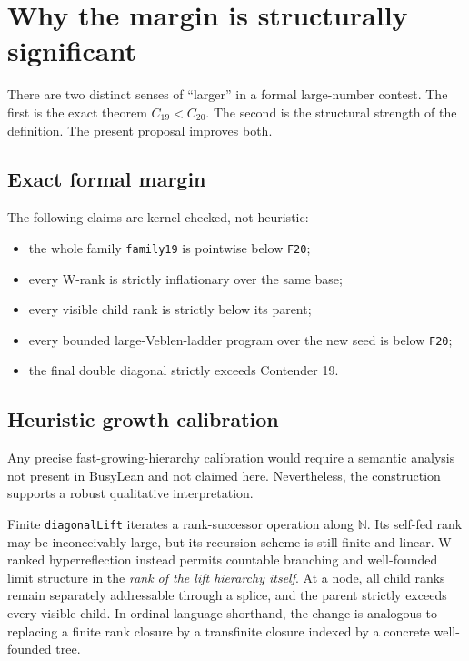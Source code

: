 \documentclass[11pt]{article}
\theoremstyle{definition}
\newcommand{\Nat}{\mathbb{N}}
\newcommand{\code}[1]{\texttt{#1}}
\newcommand{\Cnineteen}{C_{19}}
\newcommand{\Ctwenty}{C_{20}}
\begin{document}
\section{Why the margin is structurally significant}

There are two distinct senses of ``larger'' in a formal large-number contest.
The first is the exact theorem \(\Cnineteen<\Ctwenty\).  The second is the
structural strength of the definition.  The present proposal improves both.

\subsection{Exact formal margin}

The following claims are kernel-checked, not heuristic:
\begin{itemize}[leftmargin=2em]
  \item the whole family \code{family19} is pointwise below \code{F20};
  \item every W-rank is strictly inflationary over the same base;
  \item every visible child rank is strictly below its parent;
  \item every bounded large-Veblen-ladder program over the new seed is below
        \code{F20};
  \item the final double diagonal strictly exceeds Contender 19.
\end{itemize}

\subsection{Heuristic growth calibration}

Any precise fast-growing-hierarchy calibration would require a semantic
analysis not present in BusyLean and not claimed here.  Nevertheless, the
construction supports a robust qualitative interpretation.

Finite \code{diagonalLift} iterates a rank-successor operation along
\(\Nat\).  Its self-fed rank may be inconceivably large, but its recursion
scheme is still finite and linear.  W-ranked hyperreflection instead permits
countable branching and well-founded limit structure in the \emph{rank of the
lift hierarchy itself}.  At a node, all child ranks remain separately
addressable through a splice, and the parent strictly exceeds every visible
child.  In ordinal-language shorthand, the change is analogous to replacing a
finite rank closure by a transfinite closure indexed by a concrete
well-founded tree.
\end{document}

